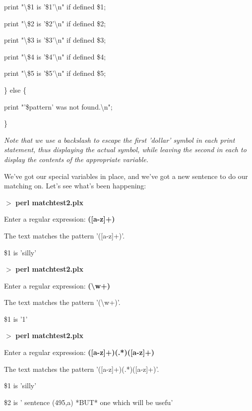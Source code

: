 \documentclass[a4paper,11pt]{book}
\begin{document}
\noindent print "\textbackslash \$1 is '\$1'\textbackslash n" if defined \$1;

\noindent print "\textbackslash \$2 is '\$2'\textbackslash n" if defined \$2;

\noindent print "\textbackslash \$3 is '\$3'\textbackslash n" if defined \$3;

\noindent print "\textbackslash \$4 is '\$4'\textbackslash n" if defined \$4;

\noindent print "\textbackslash \$5 is '\$5'\textbackslash n" if defined \$5;

\noindent \} else \{

\noindent print "'\$pattern' was not found.\textbackslash n";

\noindent \}

\noindent 

\noindent \textit{Note that we use a backslash to escape the first 'dollar' symbol in each print statement, thus displaying the actual symbol, while leaving the second in each to display the contents of the appropriate variable.}

\noindent 

\noindent We've got our special variables in place, and we've got a new sentence to do our matching on. Let's see what's been happening:

\noindent 

\noindent $>$ \textbf{perl matchtest2.plx}

\noindent Enter a regular expression: \textbf{([a-z]+)}

\noindent The text matches the pattern '([a-z]+)'.

\noindent \$1 is 'silly'

\noindent 

\noindent $>$ \textbf{perl matchtest2.plx}

\noindent Enter a regular expression: \textbf{(\textbackslash w+)}

\noindent The text matches the pattern '(\textbackslash w+)'.

\noindent \$1 is '1'

\noindent 

\noindent $>$ \textbf{perl matchtest2.plx}

\noindent Enter a regular expression: \textbf{([a-z]+)(.*)([a-z]+)}

\noindent The text matches the pattern '([a-z]+)(.*)([a-z]+)'.

\noindent \$1 is 'silly'

\noindent \$2 is ' sentence (495,a) *BUT* one which will be usefu'
\end{document}
